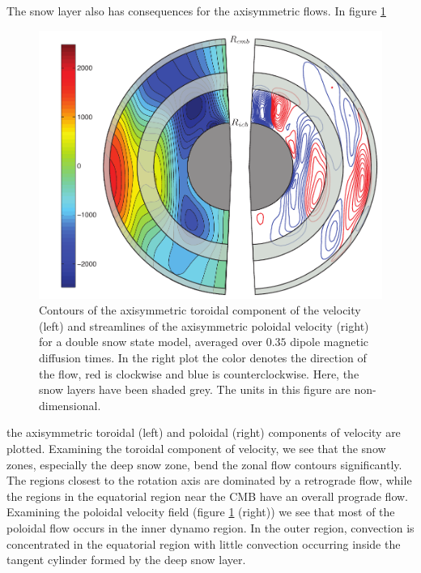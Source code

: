 The snow layer also has consequences for the axisymmetric flows. In figure \ref{fig:uax}
\begin{figure}
	\centering
	\noindent\includegraphics[width=.6\linewidth]{Chapter4/figures/uxtpavg19_043_2460-2530}
	\caption{Contours of the axisymmetric toroidal component of the velocity (left) and streamlines of the axisymmetric poloidal velocity (right) for a double snow state model, averaged over $0.35$ dipole magnetic diffusion times. In the right plot the color denotes the direction of the flow, red is clockwise and blue is counterclockwise. Here, the snow layers have been shaded grey. The units in this figure are non-dimensional.}
	\label{fig:uax}
\end{figure}
 the axisymmetric toroidal (left) and poloidal (right) components of velocity are plotted. Examining the toroidal component of velocity, we see that the snow zones, especially the deep snow zone, bend the zonal flow contours significantly. The regions closest to the rotation axis are dominated by a retrograde flow, while the regions in the equatorial region near the CMB have an overall prograde flow. Examining the poloidal velocity field (figure \ref{fig:uax} (right)) we see that most of the poloidal flow occurs in the inner dynamo region. In the outer region, convection is concentrated in the equatorial region with little convection occurring inside the tangent cylinder formed by the deep snow layer. 

